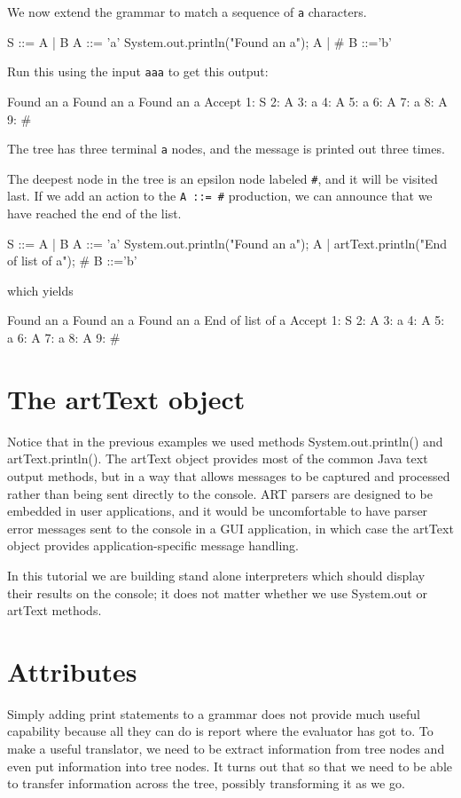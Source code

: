 We now extend the grammar to match a sequence of {\tt a} characters.
\begin{codeblock}
S ::= A | B
A ::= 'a' {System.out.println("Found an a");} A | #
B ::='b'
\end{codeblock}

Run this using the input {\tt aaa} to get this output:
\begin{codeblock}
Found an a
Found an a
Found an a
Accept
1: S
  2: A
    3: a
    4: A
      5: a
      6: A
        7: a
        8: A
          9: #
\end{codeblock}
The tree has three terminal {\tt a} nodes, and the message is printed
out three times.

The deepest node in the tree is an epsilon node labeled {\tt \#}, and
it will be visited last. If we add an action to the {\tt A ::= \#}
production, we can announce that we have reached the end of the list.
\begin{codeblock}
S ::= A | B
A ::= 'a' {System.out.println("Found an a");} A | 
       {artText.println("End of list of a"); } # 
B ::='b'
\end{codeblock}
which yields
\begin{codeblock}
Found an a
Found an a
Found an a
End of list of a
Accept
1: S
  2: A
    3: a
    4: A
      5: a
      6: A
        7: a
        8: A
          9: #
\end{codeblock}
\section{The artText object}
Notice that in the previous examples we used methods {\sf System.out.println()} and {\sf artText.println()}. The {\sf artText} object provides most of the common Java text output methods, but in a way that allows messages to be captured and processed rather than being sent directly to the console. ART parsers are designed to be embedded in user applications, and it would be uncomfortable to have parser error messages sent to the console in a GUI application, in which case the artText object provides application-specific message handling.

In this tutorial we are building stand alone interpreters which should display their results on the console; it does not matter whether we use {\sf System.out} or {\sf artText} methods.

\section{Attributes}
Simply adding print statements to a grammar does not provide much
useful capability because all they can do is report where the
evaluator has got to. To make a useful translator, we need to be extract information from tree nodes and even put information into tree nodes. It turns out that so that we need to be able
to transfer information across the tree, possibly transforming it as
we go.

